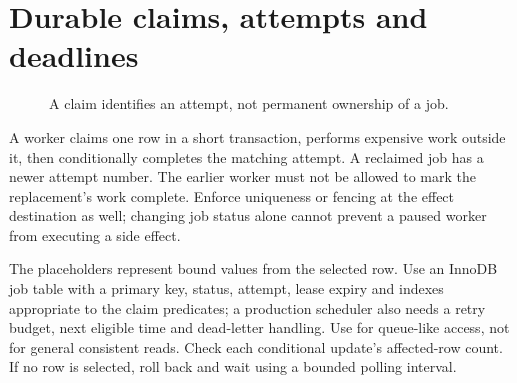 \section{Durable claims, attempts and deadlines}
\begin{figure}[!htbp]\centering
{}
\caption{A claim identifies an attempt, not permanent ownership of a job.}
\end{figure}
A worker claims one row in a short transaction, performs expensive work
outside it, then conditionally completes the matching attempt. A reclaimed
job has a newer attempt number. The earlier worker must not be allowed
to mark the replacement's work complete. Enforce uniqueness or fencing at
the effect destination as well; changing job status alone cannot prevent
a paused worker from executing a side effect.

The placeholders represent bound values from the selected row. Use an
InnoDB job table with a primary key, status, attempt, lease expiry and
indexes appropriate to the claim predicates; a production scheduler also
needs a retry budget, next eligible time and dead-letter handling.
Use  for queue-like access, not for general consistent
reads. Check each conditional update's affected-row count. If no row is
selected, roll back and wait using a bounded polling interval.

